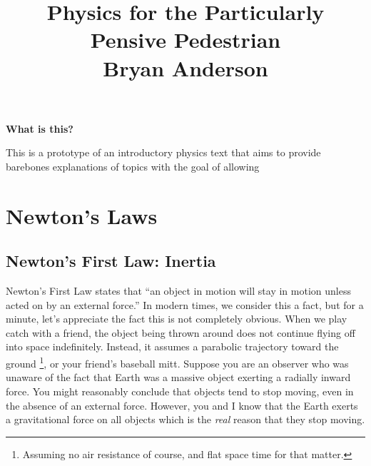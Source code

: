 \documentclass[titlepage]{article}
\title{\textbf{\huge{Physics for the Particularly Pensive Pedestrian}\\\Large{Bryan Anderson}}}
\date{}
\begin{document}

\maketitle


\begin{center}
    \textbf{\Large{What is this?}} 
\end{center}

This is a prototype of an introductory physics text that aims to provide barebones explanations of topics with the goal of allowing



\vspace{\baselineskip}
\vspace{\baselineskip}
\vspace{\baselineskip}
\vspace{\baselineskip}
\vspace{\baselineskip}
\vspace{\baselineskip}



\tableofcontents


\clearpage
{}

\section{Newton's Laws}

\subsection{Newton's First Law: Inertia} \label{sec:I}

Newton's First Law states that ``an object in motion will stay in motion unless acted on by an external force.'' In modern times, we consider this a fact, but for a minute, let's appreciate the fact this is not completely obvious. When we play catch with a friend, the object being thrown around does not continue flying off into space indefinitely. Instead, it assumes a parabolic trajectory toward the ground \footnote{Assuming no air resistance of course, and flat space time for that matter.}, or your friend's baseball mitt.
Suppose you are an observer who was unaware of the fact that Earth was a massive object exerting a radially inward force. You might reasonably conclude that objects tend to stop moving, even in the absence of an external force. However, you and I know that the Earth exerts a gravitational force on all objects which is the \textit{real} reason that they stop moving. 
\end{document}
